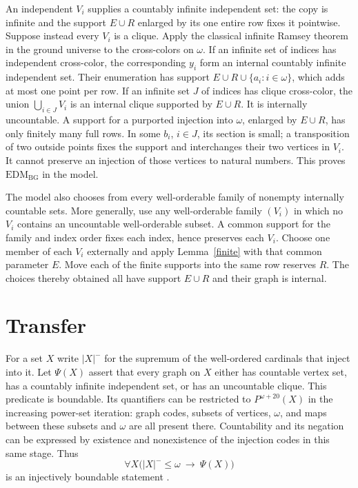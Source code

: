 \documentclass[11pt]{article}
\newcommand{\BG}{\mathrm{EDM}_{\mathrm{BG}}}
\begin{document}
An independent $V_i$ supplies a countably infinite independent set: the copy is infinite and the support $E\cup R$ enlarged by its one entire row fixes it pointwise. Suppose instead every $V_i$ is a clique. Apply the classical infinite Ramsey theorem in the ground universe to the cross-colors on $\omega$. If an infinite set of indices has independent cross-color, the corresponding $y_i$ form an internal countably infinite independent set. Their enumeration has support $E\cup R\cup\{a_i:i\in\omega\}$, which adds at most one point per row. If an infinite set $J$ of indices has clique cross-color, the union $\bigcup_{i\in J}V_i$ is an internal clique supported by $E\cup R$. It is internally uncountable. A support for a purported injection into $\omega$, enlarged by $E\cup R$, has only finitely many full rows. In some $b_i$, $i\in J$, its section is small; a transposition of two outside points fixes the support and interchanges their two vertices in $V_i$. It cannot preserve an injection of those vertices to natural numbers. This proves $\BG$ in the model.

The model also chooses from every well-orderable family of nonempty internally countable sets. More generally, use any well-orderable family $(V_i)$ in which no $V_i$ contains an uncountable well-orderable subset. A common support for the family and index order fixes each index, hence preserves each $V_i$. Choose one member of each $V_i$ externally and apply Lemma~\ref{finite} with that common parameter $E$. Move each of the finite supports into the same row reserves $R$. The choices thereby obtained all have support $E\cup R$ and their graph is internal.

\section{Transfer}
For a set $X$ write $|X|^-$ for the supremum of the well-ordered cardinals that inject into it. Let $\Psi(X)$ assert that every graph on $X$ either has countable vertex set, has a countably infinite independent set, or has an uncountable clique. This predicate is boundable. Its quantifiers can be restricted to $P^{\omega+20}(X)$ in the increasing power-set iteration: graph codes, subsets of vertices, $\omega$, and maps between these subsets and $\omega$ are all present there. Countability and its negation can be expressed by existence and nonexistence of the injection codes in this same stage. Thus
\[
 \forall X\bigl(|X|^-\le\omega\ \longrightarrow\ \Psi(X)\bigr)
\]
is an injectively boundable statement \cite[Section~5]{mad}.
\end{document}
